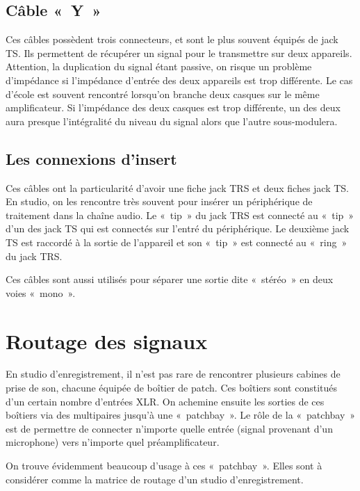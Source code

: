 \documentclass[
  letterpaper,
  DIV=11,
  numbers=noendperiod]{scrreprt}
\begin{document}
\hypertarget{cuxe2ble-y}{%
\subsection{Câble «~Y~»}\label{cuxe2ble-y}}

Ces câbles possèdent trois connecteurs, et sont le plus souvent équipés
de jack TS. Ils permettent de récupérer un signal pour le transmettre
sur deux appareils. Attention, la duplication du signal étant passive,
on risque un problème d'impédance si l'impédance d'entrée des deux
appareils est trop différente. Le cas d'école est souvent rencontré
lorsqu'on branche deux casques sur le même amplificateur. Si l'impédance
des deux casques est trop différente, un des deux aura presque
l'intégralité du niveau du signal alors que l'autre sous-modulera.

\hypertarget{les-connexions-dinsert}{%
\subsection{Les connexions d'insert}\label{les-connexions-dinsert}}

Ces câbles ont la particularité d'avoir une fiche jack TRS et deux
fiches jack TS. En studio, on les rencontre très souvent pour insérer un
périphérique de traitement dans la chaîne audio. Le «~tip~» du jack TRS
est connecté au «~tip~» d'un des jack TS qui est connectés sur l'entré
du périphérique. Le deuxième jack TS est raccordé à la sortie de
l'appareil et son «~tip~» est connecté au «~ring~» du jack TRS.

Ces câbles sont aussi utilisés pour séparer une sortie dite «~stéréo~»
en deux voies «~mono~».

\hypertarget{routage-des-signaux}{%
\section{Routage des signaux}\label{routage-des-signaux}}

En studio d'enregistrement, il n'est pas rare de rencontrer plusieurs
cabines de prise de son, chacune équipée de boîtier de patch. Ces
boîtiers sont constitués d'un certain nombre d'entrées XLR. On achemine
ensuite les sorties de ces boîtiers via des multipaires jusqu'à une
«~patchbay~». Le rôle de la «~patchbay~» est de permettre de connecter
n'importe quelle entrée (signal provenant d'un microphone) vers
n'importe quel préamplificateur.

On trouve évidemment beaucoup d'usage à ces «~patchbay~». Elles sont à
considérer comme la matrice de routage d'un studio d'enregistrement.
\end{document}
